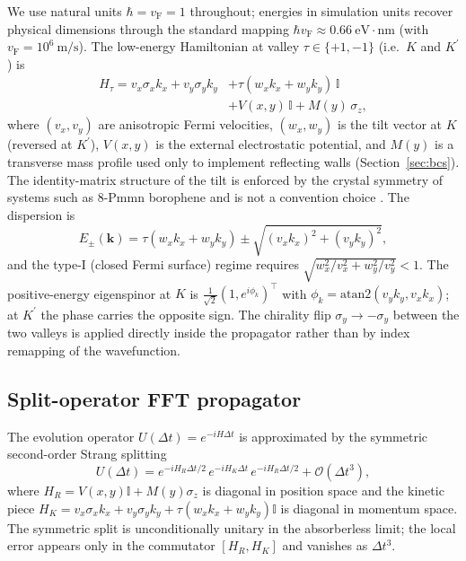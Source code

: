 \documentclass[preprint, 11pt]{elsarticle}
\newcommand{\vF}{v_\mathrm{F}}
\begin{document}
We use natural units $\hbar=\vF=1$ throughout; energies in simulation
units recover physical dimensions through the standard mapping
$\hbar \vF\approx 0.66\ \text{eV}\cdot\text{nm}$ (with
$\vF=10^6\ \text{m/s}$). The low-energy Hamiltonian at valley
$\tau\in\{+1,-1\}$ (i.e.\ $K$ and $K^\prime$) is
%
\begin{align}
H_\tau = v_x\sigma_x k_x + v_y\sigma_y k_y
       &+ \tau(w_x k_x + w_y k_y)\,\mathbb{I} \nonumber \\
       &+ V(x,y)\,\mathbb{I} + M(y)\,\sigma_z ,
\label{eq:ham}
\end{align}
%
where $(v_x,v_y)$ are anisotropic Fermi velocities, $(w_x,w_y)$ is the
tilt vector at $K$ (reversed at $K^\prime$), $V(x,y)$ is the external
electrostatic potential, and $M(y)$ is a transverse mass profile used
only to implement reflecting walls (Section~\ref{sec:bcs}). The
identity-matrix structure of the tilt is enforced by the crystal
symmetry of systems such as 8-Pmmn borophene and is not a convention
choice \cite{Goerbig2008,LopezBezanilla2016,Nguyen2018}. The
dispersion is
%
\begin{equation}
E_\pm(\mathbf{k}) = \tau(w_x k_x + w_y k_y)
  \pm\sqrt{(v_x k_x)^2 + (v_y k_y)^2},
\end{equation}
%
and the type-I (closed Fermi surface) regime requires
$\sqrt{w_x^2/v_x^2 + w_y^2/v_y^2}<1$. The positive-energy eigenspinor
at $K$ is $\frac{1}{\sqrt{2}}(1, e^{i\phi_k})^\top$ with
$\phi_k=\mathrm{atan2}(v_y k_y, v_x k_x)$; at $K^\prime$ the phase
carries the opposite sign. The chirality flip
$\sigma_y\to-\sigma_y$ between the two valleys is applied directly
inside the propagator rather than by index remapping of the
wavefunction.

\subsection{Split-operator FFT propagator}

The evolution operator $U(\Delta t)=e^{-iH\Delta t}$ is approximated
by the symmetric second-order Strang splitting
%
\begin{equation}
U(\Delta t) = e^{-iH_R\Delta t/2}\,e^{-iH_K\Delta t}\,
              e^{-iH_R\Delta t/2} + \mathcal{O}(\Delta t^3),
\label{eq:splitop}
\end{equation}
%
where $H_R=V(x,y)\mathbb{I}+M(y)\sigma_z$ is diagonal in position
space and the kinetic piece $H_K=v_x\sigma_x k_x +
v_y\sigma_y k_y + \tau(w_x k_x+w_y k_y)\mathbb{I}$ is diagonal in
momentum space. The symmetric split is unconditionally unitary in
the absorberless limit; the local error appears only in the
commutator $[H_R,H_K]$ and vanishes as $\Delta t^3$.
\end{document}
